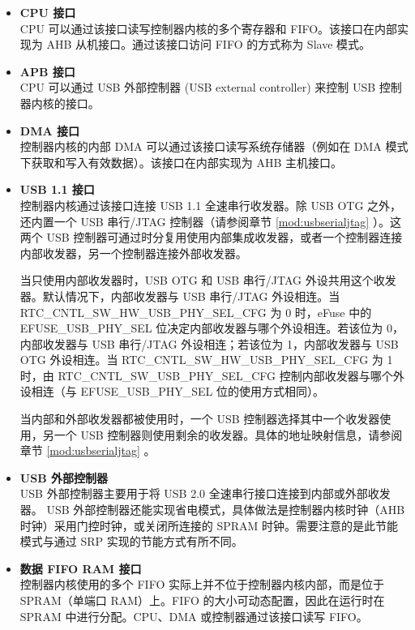 \documentclass[main\_\_CN.tex]{subfiles}
\begin{document}
\begin{itemize}
    \item {\bfseries CPU 接口}\\
   CPU 可以通过该接口读写控制器内核的多个寄存器和 FIFO。该接口在内部实现为 AHB 从机接口。通过该接口访问 FIFO 的方式称为 Slave 模式。

   \item {\bfseries APB 接口}\\
    CPU 可以通过 USB 外部控制器 (USB external controller) 来控制 USB 控制器内核的接口。

    \item {\bfseries DMA 接口}\\
    控制器内核的内部 DMA 可以通过该接口读写系统存储器（例如在 DMA 模式下获取和写入有效数据）。该接口在内部实现为 AHB 主机接口。

    \item {\bfseries USB 1.1 接口}\\
   控制器内核通过该接口连接 USB 1.1 全速串行收发器。除 USB OTG 之外，\chipname{} 还内置一个 USB 串行/JTAG 控制器（请参阅章节 \ref{mod:usbserialjtag} \textit{}）。这两个 USB 控制器可通过时分复用使用内部集成收发器，或者一个控制器连接内部收发器，另一个控制器连接外部收发器。

   当只使用内部收发器时，USB OTG 和 USB 串行/JTAG 外设共用这个收发器。默认情况下，内部收发器与 USB 串行/JTAG 外设相连。当 RTC\_CNTL\_SW\_HW\_USB\_PHY\_SEL\_CFG 为 0 时，eFuse 中的 EFUSE\_USB\_PHY\_SEL 位决定内部收发器与哪个外设相连。若该位为 0，内部收发器与 USB 串行/JTAG 外设相连；若该位为 1，内部收发器与 USB OTG 外设相连。当 RTC\_CNTL\_SW\_HW\_USB\_PHY\_SEL\_CFG 为 1 时，由 RTC\_CNTL\_SW\_USB\_PHY\_SEL\_CFG 控制内部收发器与哪个外设相连（与 EFUSE\_USB\_PHY\_SEL 位的使用方式相同）。

    当内部和外部收发器都被使用时，一个 USB 控制器选择其中一个收发器使用，另一个 USB 控制器则使用剩余的收发器。具体的地址映射信息，请参阅章节 \ref{mod:usbserialjtag} \textit{}。

    \item {\bfseries USB 外部控制器}\\
    USB 外部控制器主要用于将 USB 2.0 全速串行接口连接到内部或外部收发器。 USB 外部控制器还能实现省电模式，具体做法是控制器内核时钟（AHB 时钟）采用门控时钟，或关闭所连接的 SPRAM 时钟。需要注意的是此节能模式与通过 SRP 实现的节能方式有所不同。

    \item {\bfseries 数据 FIFO RAM 接口}\\
    控制器内核使用的多个 FIFO 实际上并不位于控制器内核内部，而是位于 SPRAM（单端口 RAM）上。FIFO 的大小可动态配置，因此在运行时在 SPRAM 中进行分配。CPU、DMA 或控制器通过该接口读写 FIFO。
\end{itemize}
\end{document}
